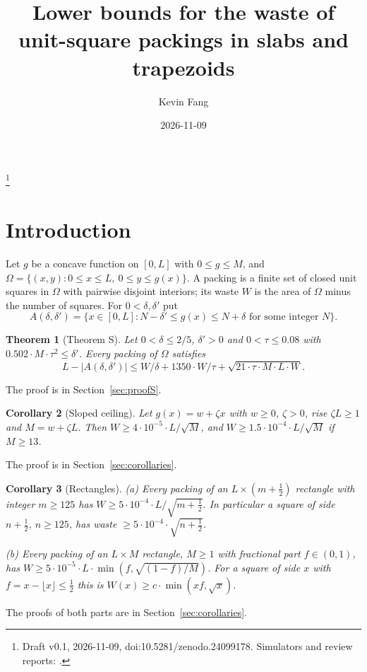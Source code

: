 \documentclass[11pt,letterpaper]{amsart}
\theoremstyle{plain}
\newtheorem{theorem}{Theorem}[section]
\newtheorem{corollary}[theorem]{Corollary}
\theoremstyle{definition}
\theoremstyle{remark}
\begin{document}
\title{Lower bounds for the waste of unit-square packings in slabs and trapezoids}
\author{Kevin Fang}
\date{2026-11-09}
\thanks{Draft v0.1, 2026-11-09, doi:10.5281/zenodo.24099178. Simulators and review reports: \cite{Fan26c}.}
\begin{abstract}

\end{abstract}
\maketitle

\section{Introduction}\label{sec:intro}

Let $g$ be a concave function on $[0,L]$ with $0\le g\le M$, and $\Omega=\{(x,y):0\le x\le L,\ 0\le y\le g(x)\}$. A packing is a finite set of closed unit squares in $\Omega$ with pairwise disjoint interiors; its waste $W$ is the area of $\Omega$ minus the number of squares. For $0<\delta,\delta'$ put
\[
A(\delta,\delta')=\{x\in[0,L]:N-\delta'\le g(x)\le N+\delta\text{ for some integer }N\}.
\]

\begin{theorem}[Theorem S]\label{thm:S}
Let $0<\delta\le 2/5$, $\delta'>0$ and $0<\tau\le 0.08$ with $0.502\cdot M\cdot\tau^2\le\delta'$. Every packing of $\Omega$ satisfies
\[
L-|A(\delta,\delta')|\le W/\delta+1350\cdot W/\tau+\sqrt{21\cdot\tau\cdot M\cdot L\cdot W}.
\]
\end{theorem}
The proof is in Section~\ref{sec:proofS}.

\begin{corollary}[Sloped ceiling]\label{cor:slope}
Let $g(x)=w+\zeta x$ with $w\ge0$, $\zeta>0$, rise $\zeta L\ge1$ and $M=w+\zeta L$. Then $W\ge4\cdot10^{-5}\cdot L/\sqrt M$, and $W\ge1.5\cdot10^{-4}\cdot L/\sqrt M$ if $M\ge13$.
\end{corollary}
The proof is in Section~\ref{sec:corollaries}.

\begin{corollary}[Rectangles]\label{cor:rect}
\textup{(a)}\label{cor:half} Every packing of an $L\times(m+\tfrac12)$ rectangle with integer $m\ge125$ has $W\ge5\cdot10^{-4}\cdot L/\sqrt{m+\tfrac12}$. In particular a square of side $n+\tfrac12$, $n\ge125$, has waste $\ge5\cdot10^{-4}\cdot\sqrt{n+\tfrac12}$.

\textup{(b)}\label{cor:fraction} Every packing of an $L\times M$ rectangle, $M\ge1$ with fractional part $f\in(0,1)$, has $W\ge5\cdot10^{-5}\cdot L\cdot\min(f,\sqrt{(1-f)/M})$. For a square of side $x$ with $f=x-\lfloor x\rfloor\le\tfrac12$ this is $W(x)\ge c\cdot\min(xf,\sqrt x)$.
\end{corollary}
The proofs of both parts are in Section~\ref{sec:corollaries}.
\end{document}
